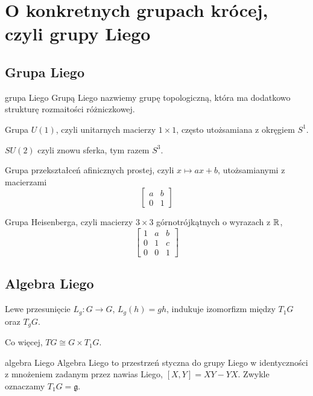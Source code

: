 \section{O konkretnych grupach krócej, czyli grupy Liego}

\subsection{Grupa Liego}

\begin{definition}{grupa Liego}{}
  Grupą Liego nazwiemy grupę topologiczną, która ma dodatkowo strukturę rozmaitości różniczkowej.
\end{definition}

\begin{example}[m]
  \item Grupa $U(1)$, czyli unitarnych macierzy $1\times 1$, często utożsamiana z okręgiem $S^1$.
  \item $SU(2)$ czyli znowu sferka, tym razem $S^3$.
  \item Grupa przekształceń afinicznych prostej, czyli $x\mapsto ax+b$, utożsamianymi z macierzami 
    $$\begin{bmatrix}
       a & b \\ 
      0 & 1 \end{bmatrix}$$
  \item Grupa Heisenberga, czyli macierzy $3\times 3$ górnotrójkątnych o wyrazach z $\mathbb{R}$,
    $$\begin{bmatrix} 1 & a  & b \\ 
      0 & 1 & c \\ 
      0 & 0 & 1 \end{bmatrix}$$
\end{example}

\subsection{Algebra Liego}

\begin{lemma}{}{}
  Lewe przesunięcie $L_g:G\to G$, $L_g(h)=gh$, indukuje izomorfizm między $T_1G$ oraz $T_gG$.
\end{lemma}

Co więcej, $TG\cong G\times T_1G$.

\begin{definition}{algebra Liego}{}
  Algebra Liego to przestrzeń styczna do grupy Liego w identyczności z mnożeniem zadanym przez nawias Liego, $[X,Y]=XY-YX$. Zwykle oznaczamy $T_1G=\mathfrak{g}$.
\end{definition}

